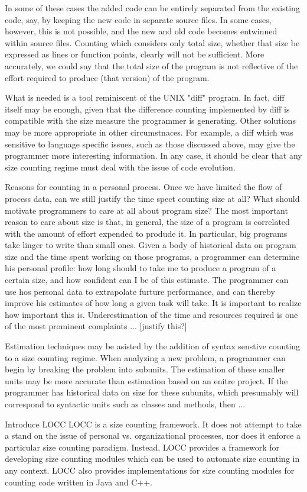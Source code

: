 \begin{introduction}
In some of these cases the added code can be entirely separated from the
existing code, say, by keeping the new code in separate source files.  In
some cases, however, this is not possible, and the new and old code becomes
entwinned within source files.  Counting which considers only total size,
whether that size be expressed as lines or function points, clearly will
not be sufficient.  More accurately, we could say that the total size of
the program is not reflective of the effort required to produce (that
version) of the program.

What is needed is a tool reminiscent of the UNIX "diff" program.  In fact,
diff itself may be enough, given that the difference counting implemented
by diff is compatible with the size measure the programmer is generating.
Other solutions may be more appropriate in other circumstnaces.  For
example, a diff which was sensitive to language specific issues, such as
those discussed above, may give the programmer more interesting
information.  In any case, it should be clear that any size counting regime
must deal with the issue of code evolution.

Reasons for counting in a personal process.  
Once we have limited the flow
of process data, can we still justify the time spect counting size at all?
What should motivate programmers to care at all about program size?  The
most important reason to care about size is that, in general, the size of a
program is correlated with the amount of effort expended to produde it.  In
particular, big programs take linger to write than small ones.  Given a
body of historical data on program size and the time spent working on those
programs, a programmer can determine his personal profile: how long should
to take me to produce a program of a certain size, and how confident can I
be of this estimate.  The programmer can use hos personal data to
extrapolate furture performance, and can thereby improve his estimates of
how long a given task will take.  It is important to realize how important
this is.  Underestimation of the time and resources required is one of the
most prominent complaints ... [justify this?]

Estimation techniques may be asisted by the addition of syntax senstive
counting to a size counting regime.  When analyzing a new problem, a
programmer can begin by breaking the problem into subunits.  The estimation
of these smaller units may be more accurate than estimation based on an
enitre project.  If the programmer has historical data on size for these
subunits, which presumably will correspond to syntactic units such as
classes and methods, then ...


Introduce LOCC LOCC is a size counting framework.  It does not attempt to
take a stand on the issue of personal vs.  organizational processes, nor
does it enforce a particular size counting paradigm.  Instead, LOCC
provides a framework for developing size counting modules which can be used
to automate size counting in any context.  LOCC also provides
implementations for size counting modules for counting code written in Java
and C++.

    \end{introduction}
 


